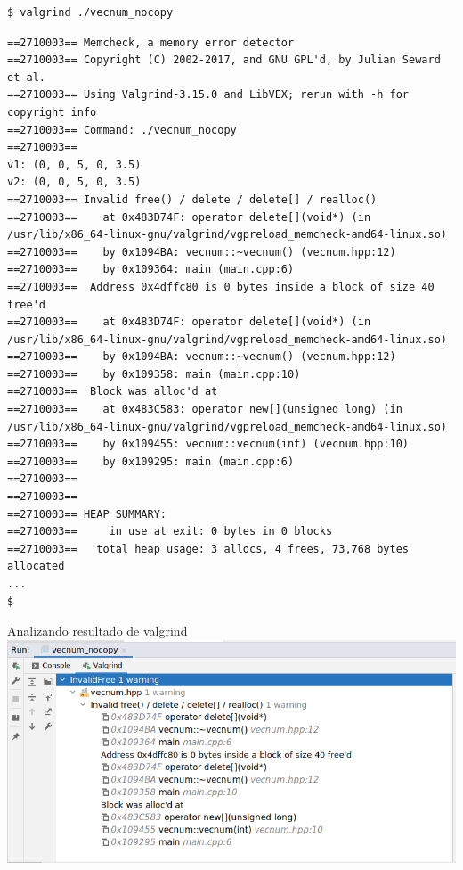 \begin{frame}[fragile]
\begin{lstlisting}[style=terminal,basicstyle=\tiny\ttfamily]
$ valgrind ./vecnum_nocopy 
\end{lstlisting}
\begin{lstlisting}[style=terminal,basicstyle=\tiny\ttfamily]
==2710003== Memcheck, a memory error detector
==2710003== Copyright (C) 2002-2017, and GNU GPL'd, by Julian Seward et al.
==2710003== Using Valgrind-3.15.0 and LibVEX; rerun with -h for copyright info
==2710003== Command: ./vecnum_nocopy
==2710003== 
v1: (0, 0, 5, 0, 3.5)
v2: (0, 0, 5, 0, 3.5)
==2710003== Invalid free() / delete / delete[] / realloc()
==2710003==    at 0x483D74F: operator delete[](void*) (in /usr/lib/x86_64-linux-gnu/valgrind/vgpreload_memcheck-amd64-linux.so)
==2710003==    by 0x1094BA: vecnum::~vecnum() (vecnum.hpp:12)
==2710003==    by 0x109364: main (main.cpp:6)
==2710003==  Address 0x4dffc80 is 0 bytes inside a block of size 40 free'd
==2710003==    at 0x483D74F: operator delete[](void*) (in /usr/lib/x86_64-linux-gnu/valgrind/vgpreload_memcheck-amd64-linux.so)
==2710003==    by 0x1094BA: vecnum::~vecnum() (vecnum.hpp:12)
==2710003==    by 0x109358: main (main.cpp:10)
==2710003==  Block was alloc'd at
==2710003==    at 0x483C583: operator new[](unsigned long) (in /usr/lib/x86_64-linux-gnu/valgrind/vgpreload_memcheck-amd64-linux.so)
==2710003==    by 0x109455: vecnum::vecnum(int) (vecnum.hpp:10)
==2710003==    by 0x109295: main (main.cpp:6)
==2710003== 
==2710003== 
==2710003== HEAP SUMMARY:
==2710003==     in use at exit: 0 bytes in 0 blocks
==2710003==   total heap usage: 3 allocs, 4 frees, 73,768 bytes allocated
...
$
\end{lstlisting}
\end{frame}

\begin{frame}[t,fragile]{Analizando resultado de valgrind}
\includegraphics[width=\textwidth]{images/03-copia/vecnum-nocopy-valgrind.png}
\end{frame}


